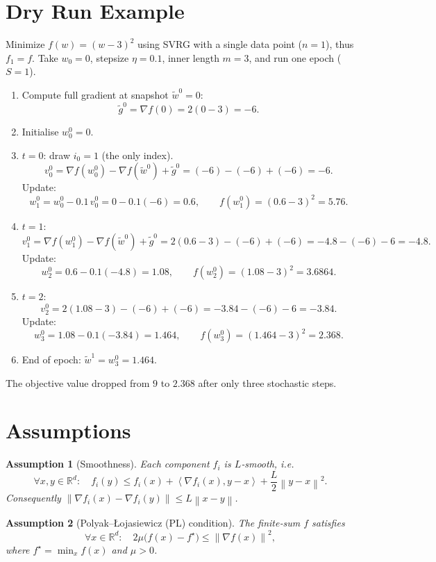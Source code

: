\documentclass{article}
\newcommand{\R}{\mathbb{R}}
\newcommand{\norm}[1]{\left\|#1\right\|}
\newcommand{\inner}[2]{\left\langle #1,#2\right\rangle}
\newtheorem{assumption}{Assumption}
\begin{document}
\section*{Dry Run Example}
Minimize $f(w)=(w-3)^2$ using SVRG with a single data point ($n=1$), thus $f_1=f$.
Take $w_0=0$, stepsize $\eta=0.1$, inner length $m=3$, and run one epoch ($S=1$).

\begin{enumerate}[label=Step \arabic*:, leftmargin=*]
\item Compute full gradient at snapshot $\tilde{w}^{0}=0$:
\[
\tilde{g}^{0}= \nabla f(0)=2(0-3)=-6.
\]
\item Initialise $w_0^{0}=0$.
\item $t=0$: draw $i_0=1$ (the only index).  
\[
v_0^{0}= \nabla f(w_0^{0})-\nabla f(\tilde{w}^{0})+\tilde{g}^{0}
        =(-6)-(-6)+(-6)=-6.
\]
Update:
\[
w_1^{0}=w_0^{0}-0.1\,v_0^{0}=0-0.1(-6)=0.6,
\qquad f(w_1^{0})=(0.6-3)^2=5.76.
\]
\item $t=1$:
\[
v_1^{0}= \nabla f(w_1^{0})-\nabla f(\tilde{w}^{0})+\tilde{g}^{0}
        =2(0.6-3)-(-6)+(-6)= -4.8-(-6)-6 = -4.8.
\]
Update:
\[
w_2^{0}=0.6-0.1(-4.8)=1.08,\qquad f(w_2^{0})=(1.08-3)^2=3.6864.
\]
\item $t=2$:
\[
v_2^{0}= 2(1.08-3)-(-6)+(-6)= -3.84-(-6)-6 = -3.84.
\]
Update:
\[
w_3^{0}=1.08-0.1(-3.84)=1.464,\qquad f(w_3^{0})=(1.464-3)^2=2.368.
\]
\item End of epoch: $\tilde{w}^{1}=w_3^{0}=1.464$.
\end{enumerate}
The objective value dropped from $9$ to $2.368$ after only three stochastic steps.

\section*{Assumptions}
\begin{assumption}[Smoothness]\label{ass:smooth}
Each component $f_i$ is $L$‑smooth, i.e.
\[
\forall x,y\in\R^{d}:\quad
f_i(y)\le f_i(x)+\inner{\nabla f_i(x)}{y-x}+\frac{L}{2}\norm{y-x}^{2}.
\tag{A1}
\]
Consequently $\norm{\nabla f_i(x)-\nabla f_i(y)}\le L\norm{x-y}$.
\end{assumption}

\begin{assumption}[Polyak–Łojasiewicz (PL) condition]\label{ass:pl}
The finite‑sum $f$ satisfies
\[
\forall x\in\R^{d}:\quad
2\mu\bigl(f(x)-f^{\star}\bigr)\le \norm{\nabla f(x)}^{2},
\tag{A2}
\]
where $f^{\star}= \min_{x}f(x)$ and $\mu>0$.
\end{assumption}
\end{document}

